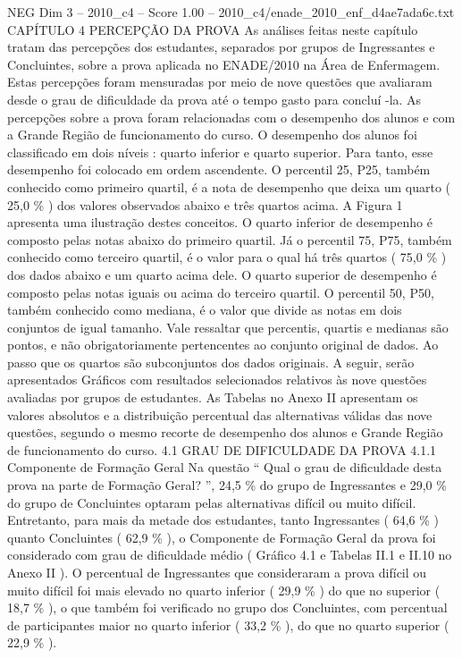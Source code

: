 \begin{textsample}{NEG Dim 3 – 2010\_c4 – Score 1.00 – 2010\_c4/enade\_2010\_enf\_d4ae7ada6c.txt}  \label{ex:f3_neg_118}
CAPÍTULO 4 PERCEPÇÃO DA PROVA As análises feitas neste capítulo tratam das percepções dos estudantes, separados por grupos de Ingressantes e Concluintes, sobre a prova aplicada no ENADE/2010 na Área de Enfermagem.
Estas percepções foram mensuradas por meio de nove questões que avaliaram desde o grau de dificuldade da prova até o tempo gasto para concluí -la.
As percepções sobre a prova foram relacionadas com o desempenho dos alunos e com a Grande Região de funcionamento do curso.
O desempenho dos alunos foi classificado em dois níveis : quarto inferior e quarto superior.
Para tanto, esse desempenho foi colocado em ordem ascendente.
O percentil 25, P25, também conhecido como primeiro quartil, é a nota de desempenho que deixa um quarto ( 25,0 \% ) dos valores observados abaixo e três quartos acima.
A Figura 1 apresenta uma ilustração destes conceitos.
O quarto inferior de desempenho é composto pelas notas abaixo do primeiro quartil.
Já o percentil 75, P75, também conhecido como terceiro quartil, é o valor para o qual há três quartos ( 75,0 \% ) dos dados abaixo e um quarto acima dele.
O quarto superior de desempenho é composto pelas notas iguais ou acima do terceiro quartil.
O percentil 50, P50, também conhecido como mediana, é o valor que divide as notas em dois conjuntos de igual tamanho.
Vale ressaltar que percentis, quartis e medianas são pontos, e não obrigatoriamente pertencentes ao conjunto original de dados.
Ao passo que os quartos são subconjuntos dos dados originais.
A seguir, serão apresentados Gráficos com resultados selecionados relativos às nove questões avaliadas por grupos de estudantes.
As Tabelas no Anexo II apresentam os valores absolutos e a distribuição percentual das alternativas válidas das nove questões, segundo o mesmo recorte de desempenho dos alunos e Grande Região de funcionamento do curso. 4.1 GRAU DE DIFICULDADE DA PROVA 4.1.1 Componente de Formação Geral Na questão “ Qual o grau de dificuldade desta prova na parte de Formação Geral? ”, 24,5 \% do grupo de Ingressantes e 29,0 \% do grupo de Concluintes optaram pelas alternativas difícil ou muito difícil.
Entretanto, para mais da metade dos estudantes, tanto Ingressantes ( 64,6 \% ) quanto Concluintes ( 62,9 \% ), o Componente de Formação Geral da prova foi considerado com grau de dificuldade médio ( Gráfico 4.1 e Tabelas II.1 e II.10 no Anexo II ).
O percentual de Ingressantes que consideraram a prova difícil ou muito difícil foi mais elevado no quarto inferior ( 29,9 \% ) do que no superior ( 18,7 \% ), o que também foi verificado no grupo dos Concluintes, com percentual de participantes maior no quarto inferior ( 33,2 \% ), do que no quarto superior ( 22,9 \% ).

\end{textsample}
